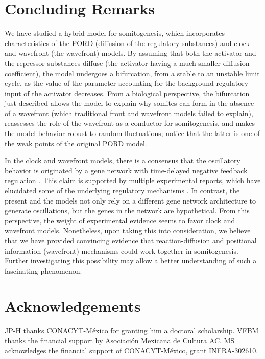 \documentclass[11pt]{article}
\begin{document}
	
	\section{Concluding Remarks}
	\label{conclu}
	
	We have studied a hybrid model for somitogenesis, which incorporates 
	characteristics of the PORD (diffusion of the regulatory substances) and 
	clock-and-wavefront (the wavefront) models. By assuming that both the activator 
	and the repressor substances diffuse (the activator having a much smaller 
	diffusion coefficient), the model undergoes a bifurcation, from a stable to an 
	unstable limit cycle, as the value of the parameter accounting for the background
	regulatory input of the activator decreases. From a biological perspective, the
	bifurcation just described allows the model to explain why somites can form in
	the absence of a wavefront (which traditional front and wavefront models failed
	to explain), reassesses the role of the wavefront as a conductor for
	somitogenesis, and makes the model behavior robust to random fluctuations;
	notice that the latter is one of the weak points of the original PORD model.  
	
	In the clock and wavefront models, there is a consensus that the oscillatory
	behavior is originated by a gene network with time-delayed negative feedback
	regulation \citep{Monk2003, Lewis2003}. This claim is supported by multiple
	experimental reports, which have elucidated some of the underlying regulatory
	mechanisms \citep{Schroter2012}. In contrast, the present and the
	\citet{Cotterell2015} models not only rely on a different gene network
	architecture to generate oscillations, but the genes in the network are
	hypothetical. From this perspective, the weight of experimental evidence seems
	to favor clock and wavefront models. Nonetheless, upon taking this into
	consideration, we
	believe that we have provided convincing evidence that reaction-diffusion and
	positional information (wavefront) mechanisms could work together in
	somitogenesis. Further investigating this possibility may allow a better
	understanding of such a fascinating phenomenon.
	
	
\section*{Acknowledgements}

JP-H thanks CONACYT-México for granting him a doctoral scholarship. VFBM thanks the financial support by Asociación Mexicana de Cultura AC. MS acknowledges the financial support of CONACYT-México, grant INFRA-302610. 
	
\end{document}
